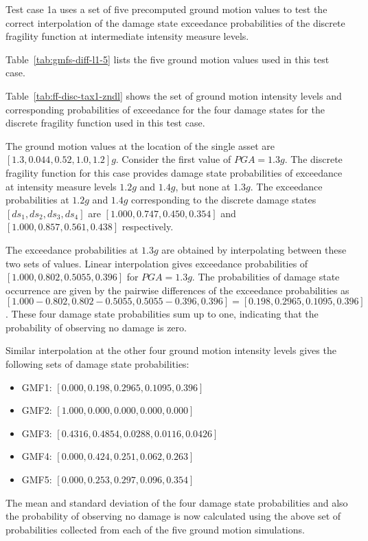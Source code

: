 Test case 1a uses a set of five precomputed ground motion values to test the correct interpolation of the damage state exceedance probabilities of the discrete fragility function at intermediate intensity measure levels.

Table~\ref{tab:gmfs-diff-l1-5} lists the five ground motion values used in this test case.



Table~\ref{tab:ff-disc-tax1-zndl} shows the set of ground motion intensity levels and corresponding probabilities of exceedance for the four damage states for the discrete fragility function used in this test case.

The ground motion values at the location of the single asset are $[1.3, 0.044, 0.52, 1.0, 1.2] g$. Consider the first value of $PGA = 1.3 g$. The discrete fragility function for this case provides damage state probabilities of exceedance at intensity measure levels $1.2 g$ and $1.4 g$, but none at $1.3 g$. The exceedance probabilities at $1.2 g$ and $1.4 g$ corresponding to the discrete damage states $[ds_1, ds_2, ds_3, ds_4]$ are $[1.000, 0.747, 0.450, 0.354]$ and $[1.000, 0.857, 0.561, 0.438]$ respectively.

The exceedance probabilities at $1.3 g$ are obtained by interpolating between these two sets of values. Linear interpolation gives exceedance probabilities of $[1.000, 0.802, 0.5055, 0.396]$ for $PGA = 1.3 g$. The probabilities of damage state occurrence are given by the pairwise differences of the exceedance probabilities as $[1.000 - 0.802, 0.802 - 0.5055, 0.5055 - 0.396, 0.396] = [0.198, 0.2965, 0.1095, 0.396]$. These four damage state probabilities sum up to one, indicating that the probability of observing no damage is zero.

Similar interpolation at the other four ground motion intensity levels gives the following sets of damage state probabilities:

\begin{itemize}
	\item GMF1: $[0.000, 0.198, 0.2965, 0.1095, 0.396]$
	\item GMF2: $[1.000, 0.000, 0.000, 0.000, 0.000]$
	\item GMF3: $[0.4316, 0.4854, 0.0288, 0.0116, 0.0426]$
	\item GMF4: $[0.000, 0.424, 0.251, 0.062, 0.263]$
	\item GMF5: $[0.000, 0.253, 0.297, 0.096, 0.354]$
\end{itemize}

The mean and standard deviation of the four damage state probabilities and also the probability of observing no damage is now calculated using the above set of probabilities collected from each of the five ground motion simulations.